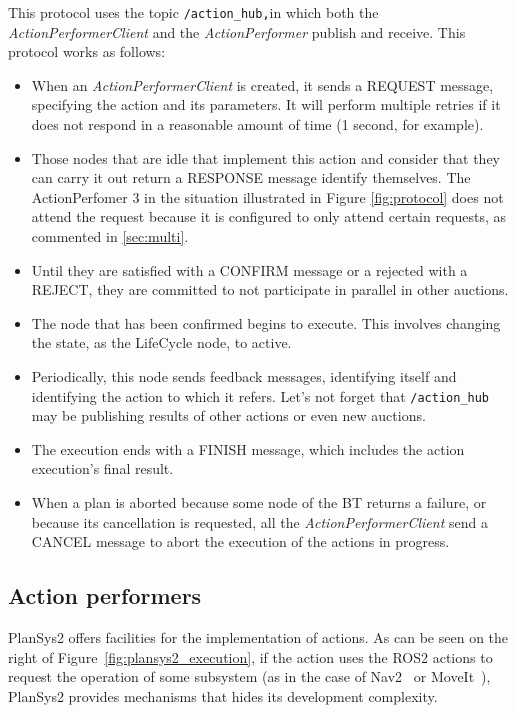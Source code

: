 \documentclass[letterpaper, 10 pt, conference]{IEEEtran}
\begin{document}
This protocol uses the topic \small\texttt{/action\_hub,}\normalsize in which both the \emph{ActionPerformerClient} and the \emph{ActionPerformer} publish and receive. This protocol works as follows:
\begin{itemize}
    \item When an \emph{ActionPerformerClient} is created, it sends a REQUEST message, specifying the action and its parameters. It will perform multiple retries if it does not respond in a reasonable amount of time (1 second, for example).
    \item Those nodes that are idle that implement this action and consider that they can carry it out return a RESPONSE message identify themselves. The ActionPerfomer 3 in the situation illustrated in Figure \ref{fig:protocol} does not attend the request because it is configured to only attend certain requests, as commented in \ref{sec:multi}.
    \item Until they are satisfied with a CONFIRM message or a rejected with a REJECT, they are committed to not participate in parallel in other auctions.
    \item The node that has been confirmed begins to execute. This involves changing the state, as the LifeCycle node, to active.
    \item Periodically, this node sends feedback messages, identifying itself and identifying the action to which it refers. Let's not forget that \small\texttt{/action\_hub }\normalsize may be publishing results of other actions or even new auctions.
    \item The execution ends with a FINISH message, which includes the action execution's final result.
    \item When a plan is aborted because some node of the BT returns a failure, or because its cancellation is requested, all the \emph{ActionPerformerClient} send a CANCEL message to abort the execution of the actions in progress.
\end{itemize}


\subsection{Action performers}

PlanSys2 offers facilities for the implementation of actions. As can be seen on the right of Figure~\ref{fig:plansys2_execution}, if the action uses the ROS2 actions to request the operation of some subsystem (as in the case of Nav2~\cite{macenski2020marathon2} or MoveIt~\cite{8793898}), PlanSys2 provides mechanisms that hides its development complexity.
\end{document}

